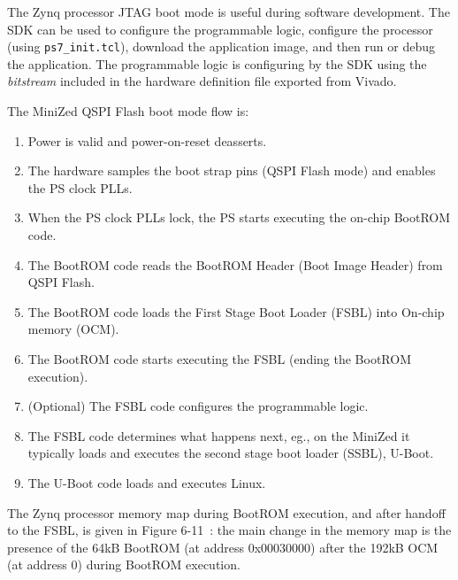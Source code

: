 The Zynq processor JTAG boot mode is useful during software development. The SDK can
be used to configure the programmable logic, configure the processor (using \verb+ps7_init.tcl+),
download the application image, and then run or debug the application.
%
The programmable logic is configuring by the SDK using the \emph{bitstream}
included in the hardware definition file exported from Vivado.

The MiniZed QSPI Flash boot mode flow is:
%
\begin{enumerate}
\item Power is valid and power-on-reset deasserts.
\item The hardware samples the boot strap pins (QSPI Flash mode)
and enables the PS clock PLLs.
\item When the PS clock PLLs lock, the PS starts executing the on-chip BootROM code.
\item The BootROM code reads the BootROM Header (Boot Image Header) from QSPI Flash.
\item The BootROM code loads the First Stage Boot Loader (FSBL) into On-chip memory (OCM).
\item The BootROM code starts executing the FSBL (ending the BootROM execution).
\item (Optional) The FSBL code configures the programmable logic.
\item The FSBL code determines what happens next, eg., on the MiniZed it
typically loads and executes the second stage boot loader (SSBL), U-Boot.
\item The U-Boot code loads and executes Linux.
\end{enumerate}
%
The Zynq processor memory map during BootROM execution, and after handoff to the
FSBL, is given in Figure 6-11~\cite{Xilinx_UG585_2021}: the main change in the
memory map is the presence of the 64kB BootROM (at address 0x00030000) after the
192kB OCM (at address 0) during BootROM execution.

